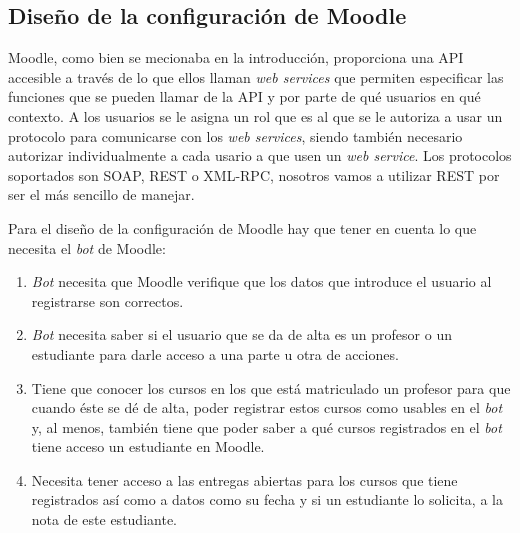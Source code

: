 \subsection{Diseño de la configuración de Moodle}

Moodle, como bien se mecionaba en la introducción, proporciona una API accesible a través de lo que ellos llaman \textit{web services}  que permiten especificar las funciones que se pueden llamar de la API y por parte de qué usuarios en qué contexto. A los usuarios se le asigna un rol que es al que se le autoriza a usar un protocolo para comunicarse con los \textit{web services}, siendo también necesario autorizar individualmente a cada usario a que usen un \textit{web service}.  Los protocolos soportados son SOAP, REST o XML-RPC, nosotros vamos a utilizar REST por ser el más sencillo de manejar.
\par

Para el diseño de la configuración de Moodle hay que tener en cuenta lo que necesita el \textit{bot} de Moodle:
\begin{enumerate} 
\item \textit{Bot} necesita que Moodle verifique que los datos que introduce el usuario al registrarse son correctos.
\item \textit{Bot} necesita saber si el usuario que se da de alta es un profesor o un estudiante para darle acceso a una parte u otra de acciones.
\item Tiene que conocer los cursos en los que está matriculado un profesor para que cuando éste se dé de alta, poder registrar estos cursos como usables en el \textit{bot} y, al menos, también tiene que poder saber a qué cursos registrados en el \textit{bot} tiene acceso un estudiante en Moodle.
\item Necesita tener acceso a las entregas abiertas para los cursos que tiene registrados así como a datos como su fecha y si un estudiante lo solicita, a la nota de este estudiante.

\end{enumerate}


